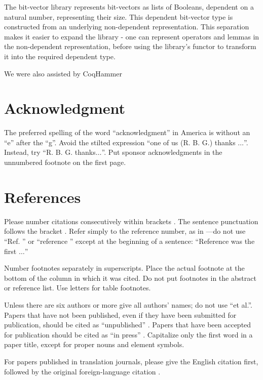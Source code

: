 \documentclass[conference]{IEEEtran}
\begin{document}
The bit-vector library represents bit-vectors as 
lists of Booleans, dependent on a natural number, 
representing their size. This dependent bit-vector 
type is constructed from an underlying non-dependent 
representation. This separation makes it easier to 
expand the library - one can represent operators 
and lemmas in the non-dependent representation, 
before using the library's functor to transform it 
into the required dependent type. 

We were also assisted by CoqHammer


\section*{Acknowledgment}

The preferred spelling of the word ``acknowledgment'' in America is without 
an ``e'' after the ``g''. Avoid the stilted expression ``one of us (R. B. 
G.) thanks $\ldots$''. Instead, try ``R. B. G. thanks$\ldots$''. Put sponsor 
acknowledgments in the unnumbered footnote on the first page.

\section*{References}

Please number citations consecutively within brackets \cite{b1}. The 
sentence punctuation follows the bracket \cite{b2}. Refer simply to the reference 
number, as in \cite{b3}---do not use ``Ref. \cite{b3}'' or ``reference \cite{b3}'' except at 
the beginning of a sentence: ``Reference \cite{b3} was the first $\ldots$''

Number footnotes separately in superscripts. Place the actual footnote at 
the bottom of the column in which it was cited. Do not put footnotes in the 
abstract or reference list. Use letters for table footnotes.

Unless there are six authors or more give all authors' names; do not use 
``et al.''. Papers that have not been published, even if they have been 
submitted for publication, should be cited as ``unpublished'' \cite{b4}. Papers 
that have been accepted for publication should be cited as ``in press'' \cite{b5}. 
Capitalize only the first word in a paper title, except for proper nouns and 
element symbols.

For papers published in translation journals, please give the English 
citation first, followed by the original foreign-language citation \cite{b6}.
\end{document}
